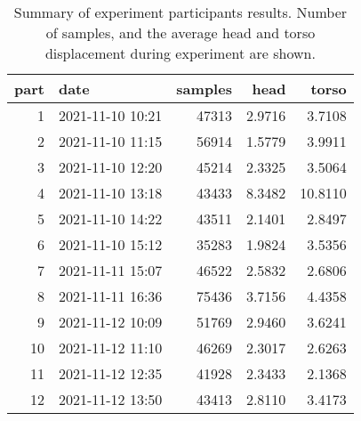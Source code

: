 \begin{table}
\centering
\caption{Summary of experiment participants results.  Number of samples, and the average head and torso displacement during experiment are shown.}
\label{table-subject-summary}
\begin{tabular}{rlrrr}
\toprule
part &             date & samples &   head &   torso \\
\midrule
   1 & 2021-11-10 10:21 &   47313 & 2.9716 &  3.7108 \\
   2 & 2021-11-10 11:15 &   56914 & 1.5779 &  3.9911 \\
   3 & 2021-11-10 12:20 &   45214 & 2.3325 &  3.5064 \\
   4 & 2021-11-10 13:18 &   43433 & 8.3482 & 10.8110 \\
   5 & 2021-11-10 14:22 &   43511 & 2.1401 &  2.8497 \\
   6 & 2021-11-10 15:12 &   35283 & 1.9824 &  3.5356 \\
   7 & 2021-11-11 15:07 &   46522 & 2.5832 &  2.6806 \\
   8 & 2021-11-11 16:36 &   75436 & 3.7156 &  4.4358 \\
   9 & 2021-11-12 10:09 &   51769 & 2.9460 &  3.6241 \\
  10 & 2021-11-12 11:10 &   46269 & 2.3017 &  2.6263 \\
  11 & 2021-11-12 12:35 &   41928 & 2.3433 &  2.1368 \\
  12 & 2021-11-12 13:50 &   43413 & 2.8110 &  3.4173 \\
\bottomrule
\end{tabular}
\end{table}
